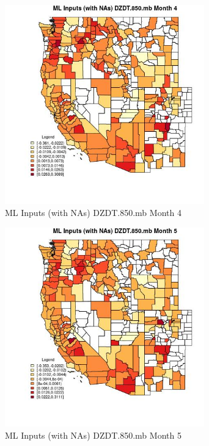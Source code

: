 \begin{figure} 
\centering  
\includegraphics[width=0.77\textwidth]{Code_Outputs/Report_ML_input_PM25_Step4_part_f_de_duplicated_aves_prioritize_24hr_obswNAs_CountyDZDT850mbmedianMonth4.jpg} 
\caption{\label{fig:Report_ML_input_PM25_Step4_part_f_de_duplicated_aves_prioritize_24hr_obswNAsCountyDZDT850mbmedianMonth4}ML Inputs (with NAs) DZDT.850.mb Month 4} 
\end{figure} 
 

\clearpage 

\begin{figure} 
\centering  
\includegraphics[width=0.77\textwidth]{Code_Outputs/Report_ML_input_PM25_Step4_part_f_de_duplicated_aves_prioritize_24hr_obswNAs_CountyDZDT850mbmedianMonth5.jpg} 
\caption{\label{fig:Report_ML_input_PM25_Step4_part_f_de_duplicated_aves_prioritize_24hr_obswNAsCountyDZDT850mbmedianMonth5}ML Inputs (with NAs) DZDT.850.mb Month 5} 
\end{figure} 
 

